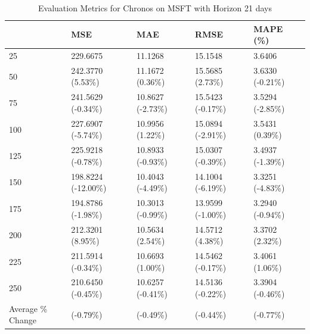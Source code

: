 \begin{table}
\caption{Evaluation Metrics for Chronos on MSFT with Horizon 21 days}
\label{tab:chronos_base_MSFT_h21_metrics}
\begin{tabular}{lllll}
\toprule
 & MSE & MAE & RMSE & MAPE (\%) \\
\midrule
25 & 229.6675 & 11.1268 & 15.1548 & 3.6406 \\
50 & 242.3770 (5.53\%) & 11.1672 (0.36\%) & 15.5685 (2.73\%) & 3.6330 (-0.21\%) \\
75 & 241.5629 (-0.34\%) & 10.8627 (-2.73\%) & 15.5423 (-0.17\%) & 3.5294 (-2.85\%) \\
100 & 227.6907 (-5.74\%) & 10.9956 (1.22\%) & 15.0894 (-2.91\%) & 3.5431 (0.39\%) \\
125 & 225.9218 (-0.78\%) & 10.8933 (-0.93\%) & 15.0307 (-0.39\%) & 3.4937 (-1.39\%) \\
150 & 198.8224 (-12.00\%) & 10.4043 (-4.49\%) & 14.1004 (-6.19\%) & 3.3251 (-4.83\%) \\
175 & 194.8786 (-1.98\%) & 10.3013 (-0.99\%) & 13.9599 (-1.00\%) & 3.2940 (-0.94\%) \\
200 & 212.3201 (8.95\%) & 10.5634 (2.54\%) & 14.5712 (4.38\%) & 3.3702 (2.32\%) \\
225 & 211.5914 (-0.34\%) & 10.6693 (1.00\%) & 14.5462 (-0.17\%) & 3.4061 (1.06\%) \\
250 & 210.6450 (-0.45\%) & 10.6257 (-0.41\%) & 14.5136 (-0.22\%) & 3.3904 (-0.46\%) \\
Average \% Change & (-0.79\%) & (-0.49\%) & (-0.44\%) & (-0.77\%) \\
\bottomrule
\end{tabular}
\end{table}
